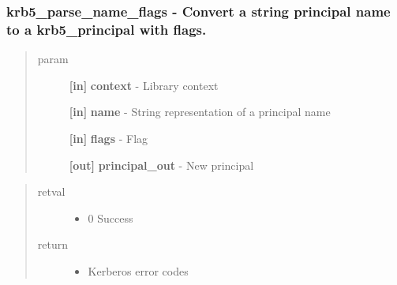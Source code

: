\documentclass[letterpaper,10pt,english]{sphinxmanual}
\begin{document}
\subsubsection{krb5\_parse\_name\_flags -  Convert a string principal name to a krb5\_principal with flags.}
\label{appdev/refs/api/krb5_parse_name_flags:krb5-parse-name-flags-convert-a-string-principal-name-to-a-krb5-principal-with-flags}\label{appdev/refs/api/krb5_parse_name_flags::doc}

\begin{fulllineitems}
\label{appdev/refs/api/krb5_parse_name_flags:c.krb5_parse_name_flags}
\end{fulllineitems}

\begin{quote}\begin{description}
\item[{param}] \leavevmode
\textbf{{[}in{]}} \textbf{context} - Library context

\textbf{{[}in{]}} \textbf{name} - String representation of a principal name

\textbf{{[}in{]}} \textbf{flags} - Flag

\textbf{{[}out{]}} \textbf{principal\_out} - New principal

\end{description}\end{quote}
\begin{quote}\begin{description}
\item[{retval}] \leavevmode\begin{itemize}
\item {} 
0   Success

\end{itemize}

\item[{return}] \leavevmode\begin{itemize}
\item {} 
Kerberos error codes

\end{itemize}

\end{description}\end{quote}
\end{document}
